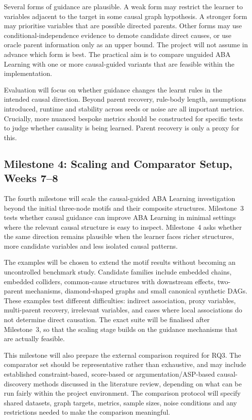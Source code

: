 Several forms of guidance are plausible. A weak form may restrict the learner to variables adjacent to the target in some causal graph hypothesis. A stronger form may prioritise variables that are possible directed parents. Other forms may use conditional-independence evidence to demote candidate direct causes, or use oracle parent information only as an upper bound. The project will not assume in advance which form is best. The practical aim is to compare unguided ABA Learning with one or more causal-guided variants that are feasible within the implementation.

Evaluation will focus on whether guidance changes the learnt rules in the intended causal direction. Beyond parent recovery, rule-body length, assumptions introduced, runtime and stability across seeds or noise are all important metrics. Crucially, more nuanced bespoke metrics should be constructed for specific tests to judge whether causality is being learned. Parent recovery is only a proxy for this.

\subsection{Milestone 4: Scaling and Comparator Setup, Weeks 7--8}
\label{subsec:milestone-scaling-guided-learning}

The fourth milestone will scale the causal-guided ABA Learning investigation beyond the initial three-node motifs and their composite structures. Milestone~3 tests whether causal guidance can improve ABA Learning in minimal settings where the relevant causal structure is easy to inspect. Milestone~4 asks whether the same direction remains plausible when the learner faces richer structures, more candidate variables and less isolated causal patterns.

The examples will be chosen to extend the motif results without becoming an uncontrolled benchmark study. Candidate families include embedded chains, embedded colliders, common-cause structures with downstream effects, two-parent mechanisms, diamond-shaped graphs and small canonical synthetic DAGs. These examples test different difficulties: indirect association, proxy variables, multi-parent recovery, irrelevant variables, and cases where local associations do not determine direct causation. The exact suite will be finalised after Milestone~3, so that the scaling stage builds on the guidance mechanisms that are actually feasible.

This milestone will also prepare the external comparison required for RQ3. The comparator set should be representative rather than exhaustive, and may include established constraint-based, score-based or argumentation/ASP-based causal-discovery methods discussed in the literature review, depending on what can be run fairly within the project environment. The comparison protocol will specify shared datasets, graph targets, metrics, sample sizes, noise conditions and any restrictions needed to make the comparison meaningful.

